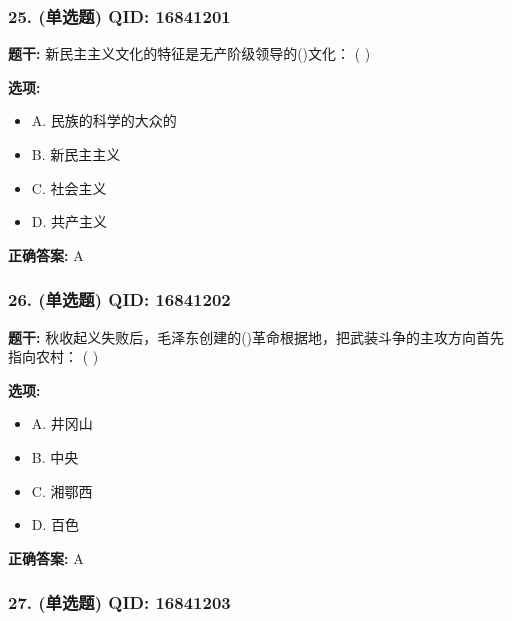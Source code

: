 \documentclass[12pt,UTF8]{ctexart}
\begin{document}
\subsubsection*{25. (单选题) \small QID: 16841201}

\textbf{题干:}
新民主主义文化的特征是无产阶级领导的()文化： ( )

\textbf{选项:}
\begin{itemize}[leftmargin=*]

  \item A. 民族的科学的大众的

  \item B. 新民主主义

  \item C. 社会主义

  \item D. 共产主义

\end{itemize}

\textbf{正确答案:}
A

\vspace{0.3em}\hrulefill\vspace{0.7em}

\subsubsection*{26. (单选题) \small QID: 16841202}

\textbf{题干:}
秋收起义失败后，毛泽东创建的()革命根据地，把武装斗争的主攻方向首先指向农村： ( )

\textbf{选项:}
\begin{itemize}[leftmargin=*]

  \item A. 井冈山

  \item B. 中央

  \item C. 湘鄂西

  \item D. 百色

\end{itemize}

\textbf{正确答案:}
A

\vspace{0.3em}\hrulefill\vspace{0.7em}

\subsubsection*{27. (单选题) \small QID: 16841203}
\end{document}
